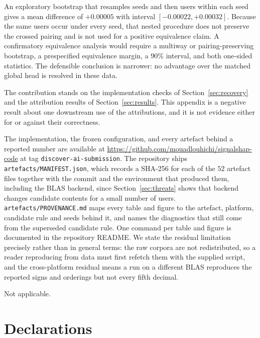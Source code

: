 \documentclass[pdflatex,sn-basic,Numbered]{sn-jnl}
\theoremstyle{plain}
\theoremstyle{definition}
\begin{document}
An exploratory bootstrap that resamples seeds and then users within each seed
gives a mean difference of $+0.00005$ with interval
$[-0.00022,+0.00032]$. Because the same users occur under every seed, that
nested procedure does not preserve the crossed pairing and is not used for a
positive equivalence claim. A confirmatory equivalence analysis would require a
multiway or pairing-preserving bootstrap, a prespecified equivalence margin, a
$90\%$ interval, and both one-sided statistics. The defensible conclusion is
narrower: no advantage over the matched global head is resolved in these data.

The contribution stands on the implementation checks of Section~\ref{sec:recovery} and the
attribution results of Section~\ref{sec:results}. This appendix is a negative
result about one downstream use of the attributions, and it is not evidence
either for or against their correctness.


\backmatter

The implementation, the frozen configuration, and every artefact behind a
reported number are available at
\url{https://github.com/mouadlouhichi/signalshap-code} at tag
\texttt{discover-ai-submission}. The repository ships
\texttt{artefacts/MANIFEST.json}, which records a SHA-256 for each of the $52$
artefact files together with the commit and the environment that produced them,
including the BLAS backend, since Section~\ref{sec:threats} shows that backend
changes candidate contents for a small number of users.
\texttt{artefacts/PROVENANCE.md} maps every table and figure to the artefact,
platform, candidate rule and seeds behind it, and names the diagnostics that
still come from the superseded candidate rule. One command per table and figure
is documented in the repository README. We state the residual limitation
precisely rather than in general terms: the raw corpora are not redistributed,
so a reader reproducing from data must first refetch them with the supplied
script, and the cross-platform residual means a run on a different BLAS
reproduces the reported signs and orderings but not every fifth decimal.

Not applicable.

\section*{Declarations}
\end{document}
